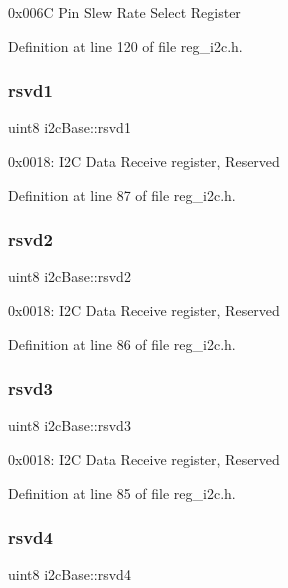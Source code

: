 0x006C Pin Slew Rate Select Register 

Definition at line 120 of file reg\+\_\+i2c.\+h.

\mbox{\label{structi2cBase_a7b2c3dca960f7ee7abc150a7be298bcd}} 
\subsubsection{\texorpdfstring{rsvd1}{rsvd1}}
{\footnotesize\ttfamily uint8 i2c\+Base\+::rsvd1}

0x0018\+: I2C Data Receive register, Reserved 

Definition at line 87 of file reg\+\_\+i2c.\+h.

\mbox{\label{structi2cBase_a51fb82d359c0f1a92a2a32faa033230c}} 
\subsubsection{\texorpdfstring{rsvd2}{rsvd2}}
{\footnotesize\ttfamily uint8 i2c\+Base\+::rsvd2}

0x0018\+: I2C Data Receive register, Reserved 

Definition at line 86 of file reg\+\_\+i2c.\+h.

\mbox{\label{structi2cBase_aa97348ad0460434f507237f326f9a6ab}} 
\subsubsection{\texorpdfstring{rsvd3}{rsvd3}}
{\footnotesize\ttfamily uint8 i2c\+Base\+::rsvd3}

0x0018\+: I2C Data Receive register, Reserved 

Definition at line 85 of file reg\+\_\+i2c.\+h.

\mbox{\label{structi2cBase_aa20d2b4a449c40f421a4304ce755c38a}} 
\subsubsection{\texorpdfstring{rsvd4}{rsvd4}}
{\footnotesize\ttfamily uint8 i2c\+Base\+::rsvd4}

